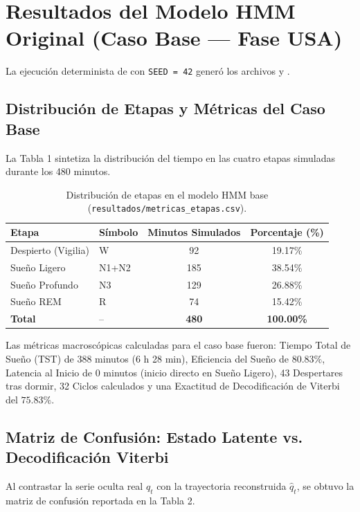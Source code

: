 \documentclass[11pt,a4paper]{article}
\begin{document}
\section{Resultados del Modelo HMM Original (Caso Base --- Fase USA)}

La ejecución determinista de  con \texttt{SEED = 42} generó los archivos  y .

\subsection{Distribución de Etapas y Métricas del Caso Base}
La Tabla 1 sintetiza la distribución del tiempo en las cuatro etapas simuladas durante los 480 minutos.

\begin{table}[htbp]
\centering
\small
\caption{Distribución de etapas en el modelo HMM base (\texttt{resultados/metricas\_etapas.csv}).}
\label{tab:metricas_base}
\begin{tabular}{llcc}
\toprule
\textbf{Etapa} & \textbf{Símbolo} & \textbf{Minutos Simulados} & \textbf{Porcentaje (\%)} \\
\midrule
Despierto (Vigilia) & W & 92 & 19.17\% \\
Sueño Ligero & N1+N2 & 185 & 38.54\% \\
Sueño Profundo & N3 & 129 & 26.88\% \\
Sueño REM & R & 74 & 15.42\% \\
\midrule
\textbf{Total} & -- & \textbf{480} & \textbf{100.00\%} \\
\bottomrule
\end{tabular}
\end{table}

Las métricas macroscópicas calculadas para el caso base fueron:
Tiempo Total de Sueño (TST) de 388 minutos (6 h 28 min), Eficiencia del Sueño de $80.83\%$, Latencia al Inicio de 0 minutos (inicio directo en Sueño Ligero), 43 Despertares tras dormir, 32 Ciclos calculados y una Exactitud de Decodificación de Viterbi del $75.83\%$.

\subsection{Matriz de Confusión: Estado Latente vs. Decodificación Viterbi}
Al contrastar la serie oculta real $q_t$ con la trayectoria reconstruida $\hat{q}_t$, se obtuvo la matriz de confusión reportada en la Tabla 2.
\end{document}
